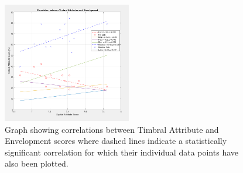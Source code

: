 	\begin{figure}
		\includegraphics[width=0.5\textwidth]{images/plots/sa_ta_corr_env.PNG}
		\caption{Graph showing correlations between Timbral Attribute and Envelopment scores where dashed lines indicate a statistically significant correlation for which their individual data points have also been plotted.}
		\label{image:corr_env} 
	\end{figure}		
